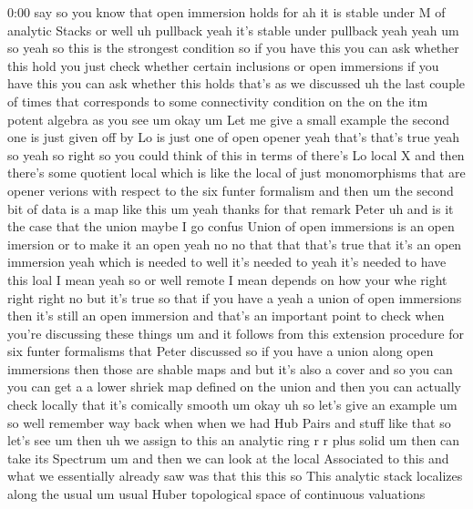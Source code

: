 \begin{unfinished}{0:00}
say  so  you  know  that  open  immersion
holds  for
ah  it  is  stable  under  M  of  analytic
Stacks  or  well  uh  pullback  yeah  it's
stable  under  pullback
yeah
yeah  um  so  yeah  so  this  is  the  strongest
condition  so  if  you  have  this  you  can
ask  whether  this  hold  you  just  check
whether  certain  inclusions  or  open
immersions  if  you  have  this  you  can  ask
whether  this  holds  that's  as  we
discussed  uh  the  last  couple  of  times
that  corresponds  to  some  connectivity
condition  on  the  on  the  itm  potent
algebra  as  you  see  um  okay  um  Let  me
give  a  small
example  the  second  one  is  just  given  off
by  Lo  is  just  one  of  open  opener  yeah
that's  that's  true  yeah  so  yeah  so  right
so  you  could  think  of  this  in  terms  of
there's  Lo  local  X  and  then  there's  some
quotient  local  which  is  like  the  local
of  just  monomorphisms  that  are  opener
verions  with  respect  to  the  six  funter
formalism  and  then  um  the  second  bit  of
data  is  a  map  like  this  um  yeah  thanks
for  that  remark
Peter
uh  and  is  it  the  case  that  the  union
maybe  I  go  confus  Union  of  open
immersions  is  an  open  imersion  or  to
make  it  an  open  yeah  no  no  that  that
that's  true  that  it's  an  open  immersion
yeah  which  is  needed
to  well  it's  needed  to  yeah  it's  needed
to  have  this  loal  I  mean  yeah  so  or  well
remote  I  mean  depends  on  how  your  whe
right  right  right  no  but  it's  true  so
that  if  you  have  a  yeah  a  union  of  open
immersions  then  it's  still  an  open
immersion  and  that's  an  important  point
to  check  when  you're  discussing  these
things  um  and  it  follows  from
this  extension  procedure  for  six  funter
formalisms  that  Peter  discussed
so  if  you  have  a  union  along  open
immersions  then  those  are  shable  maps
and  but  it's  also  a  cover  and  so  you  can
you  can  get  a  a  lower  shriek  map  defined
on  the  union  and  then  you  can  actually
check  locally  that  it's  comically
smooth  um
okay  uh  so  let's  give  an  example
um  so  well  remember  way  back  when  when
we  had  Hub  Pairs  and  stuff  like  that  so
let's
see  um
then  uh  we  assign  to  this  an  analytic
ring  r  r  plus
solid  um  then  can  take  its
Spectrum  um  and  then  we  can  look  at  the
local  Associated  to
this  and  what  we  essentially  already  saw
was  that  this  this  so  This  analytic
stack  localizes  along  the  usual
um  usual  Huber  topological  space  of
continuous  valuations

\end{unfinished}
